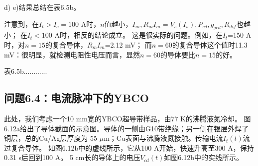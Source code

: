 d) e)结果总结在表6.5b。

注意到，在$I_t>I_c=100$ A时，$n$值越小，$I_m, R_m I_m=V_s(I_s),P_{cd},g_{jcd},R_{dif}$也越小；
在$I_t<100$ A时，相反的结论成立。
这是很实际的问题。例如，在$I_t$=150 A时，对$n=15$的复合导体，$R_mI_m$=2.12 mV；
而$n=60$的复合导体这个值时11.3 mV：很明显，就检测电阻性电压而言，显然$n=60$的导体要比$n=15$的好。 

表6.5b............


\subsection{问题6.4：电流脉冲下的YBCO}
此处，我们考虑一个10 mm宽的YBCO超导带样品，由77 K的沸腾液氮冷却。
图6.12a给出了导体截面的示意图。导体的一侧由G10带绝缘；另一侧在银层外焊了铜层，总的Cu/Ag层厚度为
55 $\mu$m；Cu表面与沸腾液氮接触。传输电流$I_t(t)$流过复合导体。
如图6.12b中的虚线所示，它从100 A开始，快速升高至300 A，保持0.31 s后回到100 A。
5 cm长的导体上的电压$V_{cd}(t)$如图6.12b中的实线所示。

